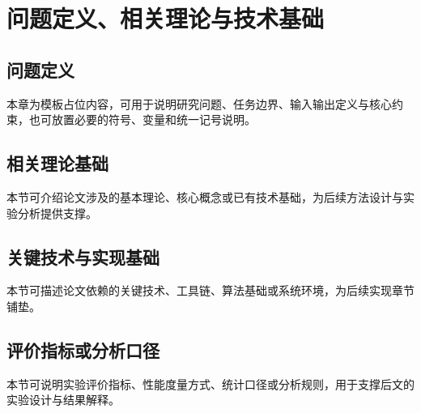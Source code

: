 \section{问题定义、相关理论与技术基础}\label{chap:tech}

\subsection{问题定义}

本章为模板占位内容，可用于说明研究问题、任务边界、输入输出定义与核心约束，也可放置必要的符号、变量和统一记号说明。

\subsection{相关理论基础}

本节可介绍论文涉及的基本理论、核心概念或已有技术基础，为后续方法设计与实验分析提供支撑。

\subsection{关键技术与实现基础}

本节可描述论文依赖的关键技术、工具链、算法基础或系统环境，为后续实现章节铺垫。

\subsection{评价指标或分析口径}

本节可说明实验评价指标、性能度量方式、统计口径或分析规则，用于支撑后文的实验设计与结果解释。
